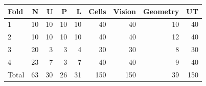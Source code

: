 \begin{tabular}{@{}lrrrrrrrr@{}}
\toprule
Fold & N & U & P & L & Cells & Vision & Geometry & UT \\
\midrule
1 & 10 & 10 & 10 & 10 & 40 & 40 & 10 & 40 \\
2 & 10 & 10 & 10 & 10 & 40 & 40 & 12 & 40 \\
3 & 20 & 3 & 3 & 4 & 30 & 30 & 8 & 30 \\
4 & 23 & 7 & 3 & 7 & 40 & 40 & 9 & 40 \\
\midrule
Total & 63 & 30 & 26 & 31 & 150 & 150 & 39 & 150 \\
\bottomrule
\end{tabular}